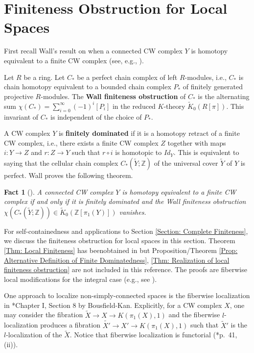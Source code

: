 \documentclass[11pt]{amsart}
\newtheorem{fact}[theorem]{Fact}
\theoremstyle{definition}
\numberwithin{equation}{section}
\numberwithin{equation}{section}
\newcommand\ZZ{\mathbb{Z}}
\begin{document}
\section{Finiteness Obstruction for Local Spaces}\label{Section: Local Finiteness}

First recall Wall's result on when a connected CW complex $Y$ is homotopy equivalent to a finite CW complex (see, e.g., \cite{Wall-Finiteness-I}\cite{Wall-Finiteness-II}\cite{Davis-Surgery}\cite{Rosenberg-algebraic-K-theory}\cite{Steve-Ranicki-Survey-Finiteness}\cite{Weinberger-Statified-spaces}). 

Let $R$ be a ring. Let $C_*$ be a perfect chain complex of left $R$-modules, i.e., $C_*$ is chain homotopy equivalent to a bounded chain complex $P_*$ of finitely generated projective $R$-modules. The \textbf{Wall finiteness obstruction} of $C_*$ is the alternating sum $\chi(C_*)=\sum_{i=0}^{\infty}(-1)^i[P_i]$ in the reduced $K$-theory $\widetilde{K}_0(R[\pi])$. This invariant of $C_*$ is independent of the choice of $P_*$.

A CW complex $Y$ is \textbf{finitely dominated} if it is a homotopy retract of a finite CW complex, i.e., there exists a finite CW complex $Z$ together with maps $i:Y\rightarrow Z$ and $r:Z\rightarrow Y$ such that $r\circ i$ is homotopic to $Id_Y$. This is equivalent to saying that the cellular chain complex $C_*(\widetilde{Y};\ZZ)$ of the universal cover $\widetilde{Y}$ of $Y$ is perfect. Wall proves the following theorem.

\begin{fact}[\cite{Wall-Finiteness-I}\cite{Wall-Finiteness-II}]
A connected CW complex $Y$ is homotopy equivalent to a finite CW complex if and only if it is finitely dominated and the Wall finiteness obstruction $\chi(C_*(\widetilde{Y};\ZZ))\in \widetilde{K}_0(\ZZ[\pi_1(Y)])$ vanishes.
\end{fact}

For self-containedness and applications to Section \ref{Section: Complete Finiteness}, we discuss the finiteness obstruction for local spaces in this section. Theorem \ref{Thm: Local Finiteness} has beenobtained in \cite{local-finiteness} but Proposition/Theorem \ref{Prop: Alternative Definition of Finite Dominatedness}, \ref{Thm: Realization of local finiteness obstruction} are not included in this reference. The proofs are fiberwise local modifications for the integral case (e.g., see \cite{pedersen2017wallsfinitenessobstruction}).


One approach to localize non-simply-connected spaces is the fiberwise localization in \cite{Bousfield-Kan}*{Chapter I, Section 8} by Bousfield-Kan. Explicitly, for a CW complex $X$, one may consider the fibration $\widetilde{X}\rightarrow X\rightarrow K(\pi_1(X),1)$ and the fiberwise $l$-localization produces a fibration $\widetilde{X'}\rightarrow X'\rightarrow K(\pi_1(X),1)$ such that $\widetilde{X}'$ is the $l$-localization of the $\widetilde{X}$. Notice that fiberwise localization is functorial (\cite{Bousfield-Kan}*{p.~41, (ii)}).
\end{document}
